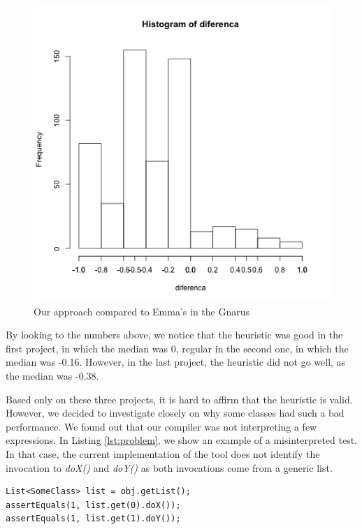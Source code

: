\documentclass{sig-alternate}
\begin{document}
\begin{figure}[h!H]
  \centering
  \includegraphics[scale=0.3]{../stats/gnarus-histograma-gelato.png}
  \caption{Our approach compared to Emma's in the Gnarus}
  \label{fig:gnarus}
\end{figure}

By looking to the numbers above, we notice that the heuristic was good in the first project,
in which the median was 0, regular in the second one, in which the median was -0.16. However,
in the last project, the heuristic did not go well, as the median was -0.38.

Based only on these three projects, it is hard to affirm that the heuristic is valid. However,
we decided to investigate closely on why some classes had such a bad performance. We found out
that our compiler was not interpreting a few expressions. In Listing \ref{lst:problem}, we
show an example of a misinterpreted test. In that case, the current implementation of the 
tool does not identify the invocation to \textit{doX()} and \textit{doY()} as both invocations
come from a generic list.

\begin{lstlisting}
List<SomeClass> list = obj.getList();
assertEquals(1, list.get(0).doX());
assertEquals(1, list.get(1).doY());
\end{lstlisting}
\end{document}
